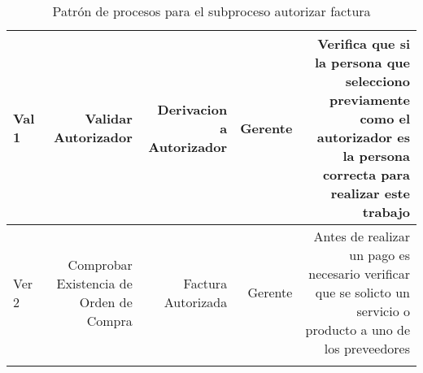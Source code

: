 \begin{longtable}{|llrrrrrr|}
	\multicolumn{2}{|m{3cm}|}{Val 1} & \multicolumn{1}{m{2cm}|}{Validar Autorizador} & \multicolumn{1}{m{2.2cm}|}{Derivacion a Autorizador} & \multicolumn{1}{m{2cm}|}{Gerente} & \multicolumn{3}{m{4cm}|}{Verifica que si la persona que selecciono previamente como el autorizador es la persona correcta para realizar este trabajo} \\ \hline
		
	\multicolumn{2}{|m{3cm}|}{Ver 2} & \multicolumn{1}{m{2cm}|}{Comprobar Existencia de Orden de Compra} & \multicolumn{1}{m{2.2cm}|}{Factura Autorizada} & \multicolumn{1}{m{2cm}|}{Gerente} & \multicolumn{3}{m{4cm}|}{Antes de realizar un pago es necesario verificar que se solicto un servicio o producto a uno de los preveedores} \\ \hline
    \caption{Patrón de procesos para el subproceso autorizar factura}
\end{longtable}
